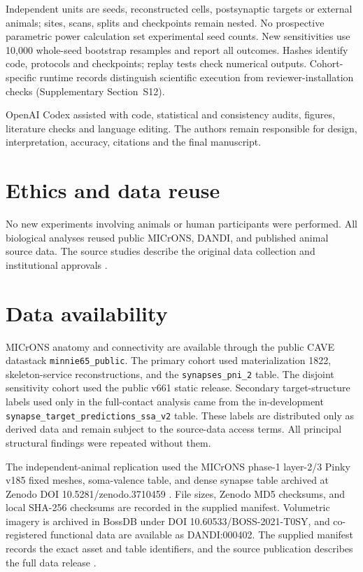 \documentclass[11pt]{article}
\begin{document}
Independent units are seeds, reconstructed cells, postsynaptic targets or external animals; sites, scans, splits and checkpoints remain nested. No prospective parametric power calculation set experimental seed counts. New sensitivities use 10,000 whole-seed bootstrap resamples and report all outcomes. Hashes identify code, protocols and checkpoints; replay tests check numerical outputs. Cohort-specific runtime records distinguish scientific execution from reviewer-installation checks (Supplementary Section~S12).

OpenAI Codex assisted with code, statistical and consistency audits, figures, literature checks and language editing. The authors remain responsible for design, interpretation, accuracy, citations and the final manuscript.



\section*{Ethics and data reuse}

No new experiments involving animals or human participants were performed.
All biological analyses reused public MICrONS, DANDI, and published animal
source data. The source studies describe the original data collection and
institutional approvals
\citep{microns2025,schneidermizell2025inhibitory,francioni2026vectorized}.

\section*{Data availability}

MICrONS anatomy and connectivity are available through the public CAVE
datastack \texttt{minnie65\_public}. The primary cohort used materialization
1822, skeleton-service reconstructions, and the
\texttt{synapses\_pni\_2} table. The disjoint sensitivity cohort used the
public v661 static release. Secondary target-structure labels used only in the
full-contact analysis came from the in-development
\texttt{synapse\_target\_predictions\_ssa\_v2} table. These labels are
distributed only as derived data and remain subject to the source-data access
terms. All principal structural findings were repeated without them.

The independent-animal replication used the MICrONS phase-1 layer-2/3 Pinky
v185 fixed meshes, soma-valence table, and dense synapse table archived at
Zenodo DOI 10.5281/zenodo.3710459 \citep{microns_pinky_v185}. File sizes,
Zenodo MD5 checksums, and local SHA-256 checksums are recorded in the supplied
manifest. Volumetric imagery is archived in BossDB under DOI
10.60533/BOSS-2021-T0SY, and co-registered functional data are available as
DANDI:000402. The supplied manifest records the exact asset and table
identifiers, and the source publication describes the full data release
\citep{microns2025}.
\end{document}
